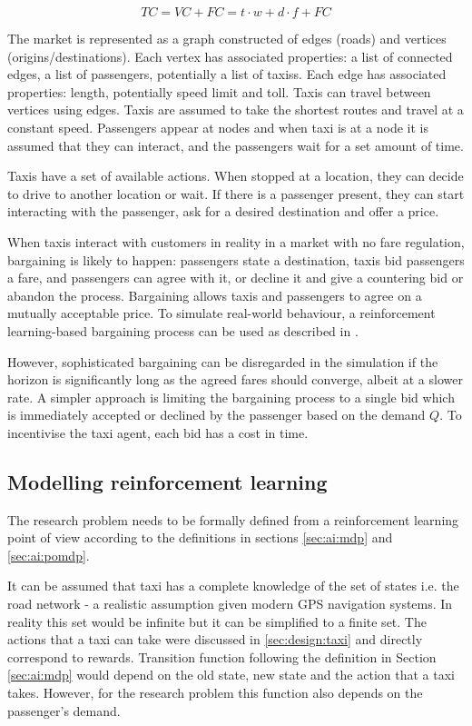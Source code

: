\[ TC = VC + FC = t \cdot w + d \cdot f + FC \]

The market is represented as a graph constructed of edges (roads) and vertices
(origins/destinations). Each vertex has associated properties: a list of
connected edges, a list of passengers, potentially a list of taxiss. Each edge
has associated properties: length, potentially speed limit and toll. Taxis can
travel between vertices using edges. Taxis are assumed to take the shortest
routes and travel at a constant speed. Passengers appear at nodes and when taxi
is at a node it is assumed that they can interact, and the passengers wait for
a set amount of time.

Taxis have a set of available actions. When stopped at a location, they can
decide to drive to another location or wait. If there is a passenger present,
they can start interacting with the passenger, ask for a desired destination
and offer a price.

When taxis interact with customers in reality in a market with no fare
regulation, bargaining is likely to happen: passengers state a destination,
taxis bid passengers a fare, and passengers can agree with it, or decline it
and give a countering bid or abandon the process. Bargaining allows taxis and
passengers to agree on a mutually acceptable price. To simulate real-world
behaviour, a reinforcement learning-based bargaining process can be used as
described in \textcite{Cli1997taxi+bargaining}.

However, sophisticated bargaining can be disregarded in the simulation if the
horizon is significantly long as the agreed fares should converge, albeit at a
slower rate. A simpler approach is limiting the bargaining process to a single
bid which is immediately accepted or declined by the passenger based on the
demand \(Q\). To incentivise the taxi agent, each bid has a cost in time.


\subsection{Modelling reinforcement learning}
\label{sec:design:ai}

The research problem needs to be formally defined from a reinforcement learning
point of view according to the definitions in sections \ref{sec:ai:mdp} and
\ref{sec:ai:pomdp}.

It can be assumed that taxi has a complete knowledge of the set of states i.e.
the road network - a realistic assumption given modern GPS navigation systems.
In reality this set would be infinite but it can be simplified to a finite set.
The actions that a taxi can take were discussed in \ref{sec:design:taxi} and
directly correspond to rewards. Transition function following the definition in
Section \ref{sec:ai:mdp} would depend on the old state, new state and the
action that a taxi takes. However, for the research problem this function also depends on the passenger's demand.

